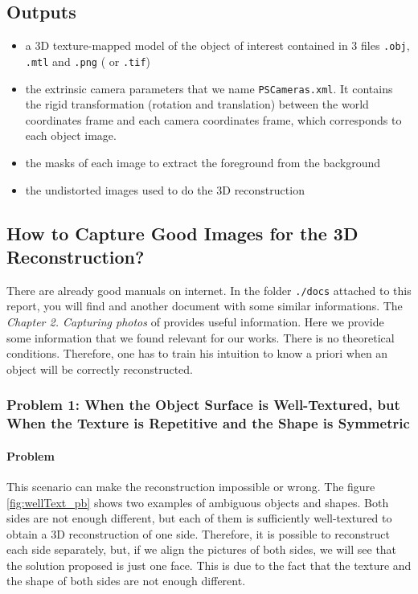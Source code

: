 \documentclass[11pt]{article}
\begin{document}
\subsection{Outputs}
\begin{itemize}
\item a 3D texture-mapped model of the object of interest contained in 3 files {\tt .obj}, {\tt .mtl} and {\tt .png} ( or {\tt .tif})
\item the extrinsic camera parameters that we name {\tt PSCameras.xml}. It contains the rigid transformation (rotation and translation) between the world coordinates frame and each camera coordinates frame, which corresponds to each object image.
\item the masks of each image to extract the foreground from the background
\item the undistorted images used to do the 3D reconstruction
\end{itemize}

\subsection{How to Capture Good Images for the 3D Reconstruction?}
\label{sec:takingObjectPictures}
There are already good manuals on internet. In the folder {\tt ./docs} attached to this report, you will find \citep{photoscanDocs} and another document with some similar informations.
The \textit{Chapter 2. Capturing photos} of \citep{photoscanDocs} provides useful information.
Here we provide some information that we found relevant for our works.
There is no theoretical conditions.
Therefore, one has to train his intuition to know a priori when an object will be correctly reconstructed.

\subsubsection{Problem 1: When the Object Surface is Well-Textured, but When the Texture is Repetitive and the Shape is Symmetric}
\paragraph{Problem}
This scenario can make the reconstruction impossible or wrong. The figure \ref{fig:wellText_pb} shows two examples of ambiguous objects and shapes.
Both sides are not enough different, but each of them is sufficiently well-textured to obtain a 3D reconstruction of one side.
Therefore, it is possible to reconstruct each side separately, but, if we align the pictures of both sides, we will see that the solution proposed is just one face.
This is due to the fact that the texture and the shape of both sides are not enough different.
\end{document}
